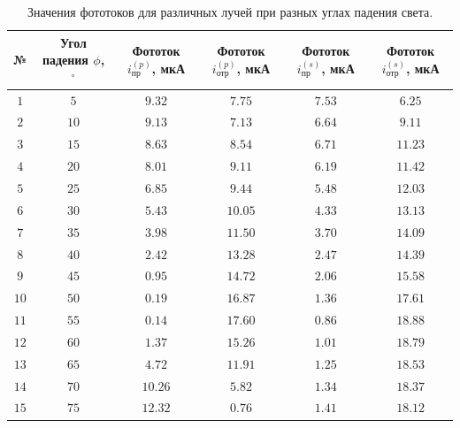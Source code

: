 \documentclass{article}
\begin{document}
\newpage
\begin{table}[h]
    \centering
    \bgroup
    \def\arraystretch{1.4}
    \begin{tabular}{|c|c|c|c|c|c|}
        \hline
        № & Угол падения $\phi$, $^\circ$ & Фототок $i^{(p)}_{\textit{пр}}$, мкА & Фототок $i^{(p)}_{\textit{отр}}$, мкА & Фототок $i^{(s)}_{\textit{пр}}$, мкА & Фототок $i^{(s)}_{\textit{отр}}$, мкА\\ \hline
        $1$ & $ 5 $ & $ 9.32 $ & $ 7.75 $ & $ 7.53 $ & $ 6.25 $\\ \hline
        $2$ & $ 10 $ & $ 9.13 $ & $ 7.13 $ & $ 6.64 $ & $ 9.11 $\\ \hline
        $3$ & $ 15 $ & $ 8.63 $ & $ 8.54 $ & $ 6.71 $ & $ 11.23 $\\ \hline
        $4$ & $ 20 $ & $ 8.01 $ & $ 9.11 $ & $ 6.19 $ & $ 11.42 $\\ \hline
        $5$ & $ 25 $ & $ 6.85 $ & $ 9.44 $ & $ 5.48 $ & $ 12.03 $\\ \hline
        $6$ & $ 30 $ & $ 5.43 $ & $ 10.05 $ & $ 4.33 $ & $ 13.13 $\\ \hline
        $7$ & $ 35 $ & $ 3.98 $ & $ 11.50 $ & $ 3.70 $ & $ 14.09 $\\ \hline
        $8$ & $ 40 $ & $ 2.42 $ & $ 13.28 $ & $ 2.47 $ & $ 14.39 $\\ \hline
        $9$ & $ 45 $ & $ 0.95 $ & $ 14.72 $ & $ 2.06 $ & $ 15.58 $\\ \hline
        $10$ & $ 50 $ & $ 0.19 $ & $ 16.87 $ & $ 1.36 $ & $ 17.61 $\\ \hline
        $11$ & $ 55 $ & $ 0.14 $ & $ 17.60 $ & $ 0.86 $ & $ 18.88 $\\ \hline
        $12$ & $ 60 $ & $ 1.37 $ & $ 15.26 $ & $ 1.01 $ & $ 18.79 $\\ \hline
        $13$ & $ 65 $ & $ 4.72 $ & $ 11.91 $ & $ 1.25 $ & $ 18.53 $\\ \hline
        $14$ & $ 70 $ & $ 10.26 $ & $ 5.82 $ & $ 1.34 $ & $ 18.37 $\\ \hline
        $15$ & $ 75 $ & $ 12.32 $ & $ 0.76 $ & $ 1.41 $ & $ 18.12 $\\ \hline
    \end{tabular}
    \egroup
    \caption{Значения фототоков для различных лучей при разных углах падения света.} 
\end{table}
\newpage
\end{document}
